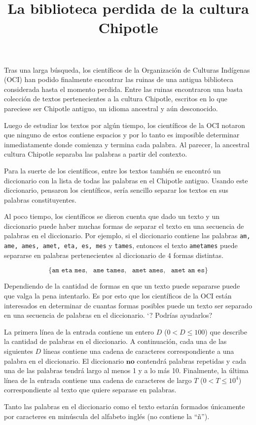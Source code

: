 \documentclass{oci}
\title{La biblioteca perdida de la cultura Chipotle}
\begin{document}
\begin{problemDescription}
Tras una larga búsqueda, los científicos de la Organización de Culturas
Indígenas (OCI) han podido finalmente encontrar las ruinas de una antigua
biblioteca considerada hasta el momento perdida.
Entre las ruinas encontraron una basta colección de textos pertenecientes a la
cultura Chipotle, escritos en lo que pareciese ser Chipotle antiguo, un idioma
ancestral y aún desconocido.

Luego de estudiar los textos por algún tiempo, los científicos de la OCI notaron
que ninguno de estos contiene espacios y por lo tanto es imposible determinar
inmediatamente donde comienza y termina cada palabra.
Al parecer, la ancestral cultura Chipotle separaba las palabras a partir del
contexto.

Para la suerte de los científicos, entre los textos también se encontró un
diccionario con la lista de todas las palabras en el Chipotle antiguo.
Usando este diccionario, pensaron los científicos, sería sencillo separar los
textos en sus palabras constituyentes.

Al poco tiempo, los científicos se dieron cuenta que dado un texto y un
diccionario puede haber muchas formas de separar el texto en una secuencia de
palabras en el diccionario.
Por ejemplo, si el diccionario contiene las palabras \texttt{am, ame, ames,
  amet, eta, es, mes} y \texttt{tames}, entonces el texto \texttt{ametames}
puede separarse en palabras pertenecientes al diccionario de 4 formas distintas.

$$\{\texttt{am eta mes},\ \ \  \texttt{ame tames},\ \ \  \texttt{amet ames},\ \ \  \texttt{amet am es}  \}$$


Dependiendo de la cantidad de formas en que un texto puede separarse puede que
valga la pena intentarlo.
Es por esto que los científicos de la OCI están interesados en determinar de
cuantas formas posibles puede un texto ser separado en una secuencia de palabras
en el diccionario.
`? Podrías ayudarlos?
\end{problemDescription}

\begin{inputDescription}
  La primera línea de la entrada contiene un entero $D$ ($0 < D \leq 100$) que
  describe la cantidad de palabras en el diccionario.
  A continuación, cada una de las siguientes $D$ líneas contiene una cadena de
  caracteres correspondiente a una palabra en el diccionario.
  El diccionario $\textbf{no}$ contendrá palabras repetidas y cada una de las
  palabras tendrá largo al menos 1 y a lo más 10.
  Finalmente, la última línea de la entrada contiene una cadena de caracteres de
  largo $T$ ($0 < T \leq 10^4$) correspondiente al texto que quiere separase en
  palabras.

  Tanto las palabras en el diccionario como el texto estarán formados
  únicamente por caracteres en minúscula del alfabeto inglés (no contiene la
  ``ñ'').
\end{inputDescription}
\end{document}
